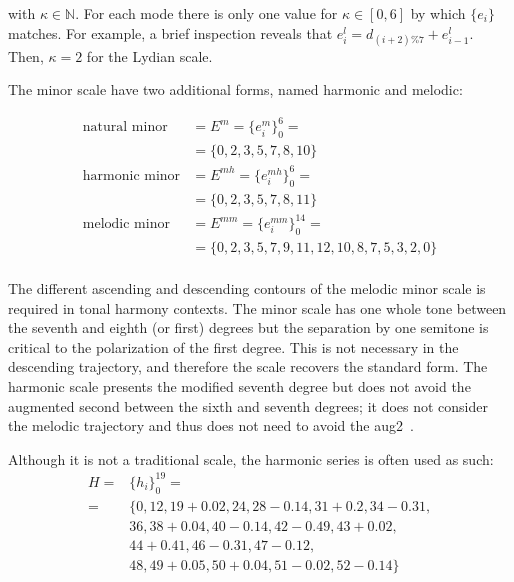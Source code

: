 \noindent with $\kappa \in \mathbb{N}$. For each mode there is only one value for $\kappa \in [0,6]$ by which $\{e_i\}$ matches. 
For example, a brief inspection reveals that
$e_i^{l}=d_{(i+2)\%7}+e_{i-1}^{l}$. Then, $\kappa=2$ for the Lydian scale.

The minor scale have two additional forms, named harmonic and melodic:

\begin{equation}\label{eq:escalasMenores}
\begin{split}
\text{natural minor}&  = E^m = \{e_i^m\}_0^6 = \\
                                           &  = \{0,2,3,5,7,8,10\} \\
\text{harmonic minor}                      &  = E^{mh} = \{e_i^{mh}\}_0^6 = \\
                                           &  = \{0,2,3,5,7,8,11\} \\
\text{melodic minor}                       &  = E^{mm} = \{e_i^{mm}\}_0^{14} = \\
                                           &  = \{0,2,3,5,7,9,11,12,10,8,7,5,3,2,0\} \\
\end{split}
\end{equation}

The different ascending and descending contours of the melodic minor scale is required in tonal harmony contexts.
The minor scale has one whole tone between the seventh and eighth (or first) degrees but
the separation by one semitone is critical to the polarization of the first degree.
This is not necessary in the descending trajectory, and therefore the scale recovers the standard form.
The harmonic scale presents the modified seventh degree but does not avoid the augmented second between the sixth and seventh degrees; it does not consider the melodic trajectory and thus does not need to avoid the aug2~\cite{Harmonia}.

Although it is not a traditional scale, the harmonic series is often used as such:
\begin{equation}\label{eq:serieHarmonica}
\begin{split}
H = & \{h_i\}_0^{19}= \\
    =  & \{ 0,12,19+0.02,  24,28-0.14, 31+0.2, 34-0.31, \\
                     & 36, 38+0.04,40-0.14, 42-0.49, 43+0.02, \\
                     & 44+0.41, 46-0.31, 47-0.12, \\
                     & 48, 49+0.05, 50+0.04, 51-0.02, 52-0.14   \}
\end{split}
\end{equation}

